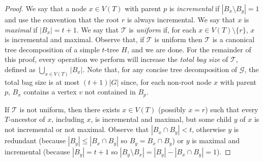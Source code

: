 \documentclass[kpfonts]{patmorin}
\theoremstyle{named}
\begin{document}
\begin{proof}
    We say that a node $x\in V(T)$ with parent $p$ is \emph{incremental} if $|B_x\setminus B_y|=1$ and use the convention that the root $r$ is always incremental.  We say that $x$ is \emph{maximal} if $|B_x|=t+1$.  We say that $\mathcal{T}$ is \emph{uniform} if, for each $x\in V(T)\setminus\{r\}$, $x$ is incremental and maximal.  Observe that, if $\mathcal{T}$ is uniform then $\mathcal{T}$ is a canonical tree decomposition of a simple $t$-tree $H$, and we are done.  For the remainder of this proof, every operation we perform will increase the \emph{total bag size} of $\mathcal{T}$, defined as $\bigcup_{x\in V(T)} |B_x|$.  Note that, for any concise tree decomposition of $\mathcal{G}$, the total bag size is at most $(t+1)|G|$ since, for each non-root node $x$ with parent $p$, $B_x$ contains a vertex $v$ not contained in $B_p$.

    If $\mathcal{T}$ is not uniform, then there exists $x\in V(T)$ (possibly $x=r$) such that every $T$-ancestor of $x$, including $x$, is incremental and maximal, but some child $y$ of $x$ is not incremental or not maximal.  Observe that $|B_x\cap B_y| < t$, otherwise $y$ is redundant (because $|B_y|\le |B_x\cap B_y|$ so $B_y=B_x\cap B_y$) or $y$ is maximal and incremental (because $|B_y|=t+1$ so $|B_y\setminus B_x|=|B_y|-|B_x\cap B_y|=1$).



\end{proof}
\end{document}
